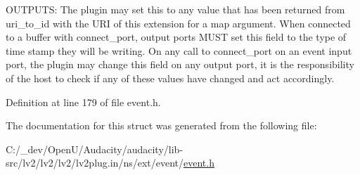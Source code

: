 O\+U\+T\+P\+U\+TS\+: The plugin may set this to any value that has been returned from uri\+\_\+to\+\_\+id with the U\+RI of this extension for a \textquotesingle{}map\textquotesingle{} argument. When connected to a buffer with connect\+\_\+port, output ports M\+U\+ST set this field to the type of time stamp they will be writing. On any call to connect\+\_\+port on an event input port, the plugin may change this field on any output port, it is the responsibility of the host to check if any of these values have changed and act accordingly. 

Definition at line 179 of file event.\+h.



The documentation for this struct was generated from the following file\+:\begin{DoxyCompactItemize}
\item 
C\+:/\+\_\+dev/\+Open\+U/\+Audacity/audacity/lib-\/src/lv2/lv2/lv2/lv2plug.\+in/ns/ext/event/\hyperlink{event_8h}{event.\+h}\end{DoxyCompactItemize}
